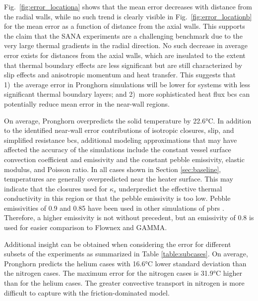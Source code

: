 Fig.\ \ref{fig:error_locationa} shows that the mean error decreases with distance from the radial walls, while no such trend is clearly visible in Fig.\ \ref{fig:error_locationb} for the mean error as a function of distance from the axial walls. This supports the claim that the SANA experiments are a challenging benchmark due to the very large thermal gradients in the radial direction. No such decrease in average error exists for distances from the axial walls, which are insulated to the extent that thermal boundary effects are less significant but are still characterized by slip effects and anisotropic momentum and heat transfer. This suggests that 1)~the average error in Pronghorn simulations will be lower for systems with less significant thermal boundary layers; and 2)~more sophisticated heat flux \glspl{bc} can potentially reduce mean error in the near-wall regions. 

On average, Pronghorn overpredicts the solid temperature by 22.6\si{\celsius}. In addition to the identified near-wall error contributions of isotropic closures, slip, and simplified resistance \glspl{bc}, additional modeling approximations that may have affected the accuracy of the simulations include the constant vessel surface convection coefficient and emissivity and the constant pebble emissivity, elastic modulus, and Poisson ratio. In all cases shown in Section \ref{sec:baseline}, temperatures are generally overpredicted near the heater surface. This may indicate that the closures used for \(\kappa_s\) underpredict the effective thermal conductivity in this region or that the pebble emissivity is too low. Pebble emissivities of 0.9 and 0.85 have been used in other simulations of \glspl{pbr} \cite{tecdoc1163,tecdoc1694}. Therefore, a higher emissivity is not without precedent, but an emissivity of 0.8 is used for easier comparison to Flownex and GAMMA. 

Additional insight can be obtained when considering the error for different subsets of the experiments as summarized in Table \ref{table:subcases}. On average, Pronghorn predicts the helium cases with 16.6\si{\celsius} lower standard deviation than the nitrogen cases. The maximum error for the nitrogen cases is 31.9\si{\celsius} higher than for the helium cases. The greater convective transport in nitrogen is more difficult to capture with the friction-dominated model. 

